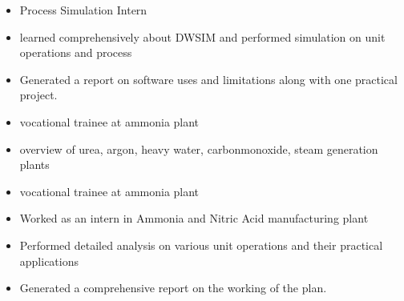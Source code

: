 \documentclass[10pt,a4paper,ragged2e]{altacv}
\begin{document}
 
\begin{itemize}
\item Process Simulation  Intern
\item learned comprehensively about DWSIM and performed simulation on unit operations and process
\item Generated a report on software uses and  limitations along with one practical project.
\end{itemize}

\divider

 
\begin{itemize}
\item vocational trainee at ammonia plant
\item overview of urea, argon, heavy water, carbonmonoxide, steam generation plants
\item vocational trainee at ammonia plant
\end{itemize}

\divider

 
\begin{itemize}
\item Worked as an intern in Ammonia and Nitric Acid manufacturing plant
\item Performed detailed analysis on various unit operations and their practical applications
\item Generated a comprehensive report on the working of the plan.
\end{itemize}

\divider



\end{document}
